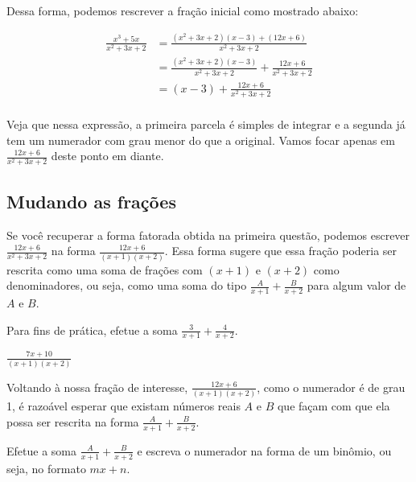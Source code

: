 \documentclass[main_estudante.tex]{subfiles}
\begin{document}
Dessa forma, podemos rescrever a fração inicial como mostrado abaixo:

\begin{align*}
\frac{x^3+5x}{x^2+3x+2} &= \frac{(x^2+3x+2)(x-3)+(12x+6)}{x^2+3x+2} \\
&=\frac{(x^2+3x+2)(x-3)}{x^2+3x+2}+\frac{12x+6}{x^2+3x+2} \\
&=(x-3)+\frac{12x+6}{x^2+3x+2} \\
\end{align*}

Veja que nessa expressão, a primeira parcela é simples de integrar e a segunda já tem um numerador com grau menor do que a original. Vamos focar apenas em $\frac{12x+6}{x^2+3x+2}$ deste ponto em diante.

\subsection*{Mudando as frações}

Se você recuperar a forma fatorada obtida na primeira questão, podemos escrever $\frac{12x+6}{x^2+3x+2}$ na forma $\frac{12x+6}{(x+1)(x+2)}$. Essa forma sugere que essa fração poderia ser rescrita como uma soma de frações com $(x+1)$ e $(x+2)$ como denominadores, ou seja, como uma soma do tipo $\frac{A}{x+1}+\frac{B}{x+2}$ para algum valor de $A$ e $B$.


\begin{questao}
Para fins de prática, efetue a soma $\frac{3}{x+1}+\frac{4}{x+2}$.
\end{questao}

\begin{gabarito}
	\begin{gabaritoQuestao}
		$\frac{7x+10}{(x+1)(x+2)}$
	\end{gabaritoQuestao}
\end{gabarito}

Voltando à nossa fração de interesse, $\frac{12x+6}{(x+1)(x+2)}$, como o numerador é de grau 1, é razoável esperar que existam números reais $A$ e $B$ que façam com que ela possa ser rescrita na forma $\frac{A}{x+1}+\frac{B}{x+2}$.

\begin{questao}
Efetue a soma $\frac{A}{x+1}+\frac{B}{x+2}$ e escreva o numerador na forma de um binômio, ou seja, no formato $mx+n$.
\end{questao}
\end{document}
